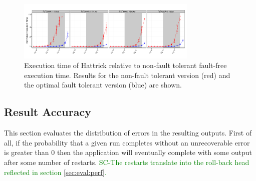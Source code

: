 \documentclass{sig-alternate}
\newcommand{\sui}[1]{%
  \textcolor{green}{SC-#1}
}
\begin{document}
{\begin{figure}[ht!]
\centering
\includegraphics[width=3.4in]{figs/Hattrick_Par_Seq_EstdCost_log.png}
\vspace{-10pt}
\caption{Execution time of Hattrick relative to non-fault tolerant fault-free execution time. Results for the non-fault tolerant version (red) and the optimal fault tolerant version (blue) are shown.}
\vspace{-10pt}
\label{fig:Hattrick_EstdCost}
\end{figure}




\subsection{Result Accuracy}
\label{sec:eval:acc}


This section evaluates the distribution of errors in the resulting outputs.
First of all, if the probability that a given run completes without an unrecoverable error is greater than 0 then the application will eventually complete with some output after some number of restarts. \sui{The restarts translate into the roll-back head reflected in section \ref{sec:eval:perf}.}

}
\end{document}
